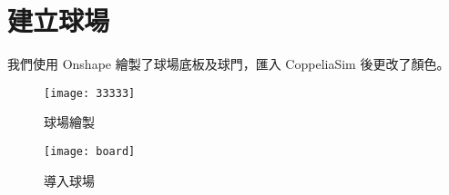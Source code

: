 \section{建立球場}
我們使用 Onshape 繪製了球場底板及球門，匯入 CoppeliaSim 後更改了顏色。\\
\begin{figure}[hbt!]
\begin{center}
\texttt{[image: 33333]}
\caption{\Large 球場繪製}\label{球場繪製}
\end{center}
\end{figure}
\begin{figure}[hbt!]
\begin{center}
\texttt{[image: board]}
\caption{\Large 導入球場}\label{導入球場}
\end{center}
\end{figure}
\newpage

